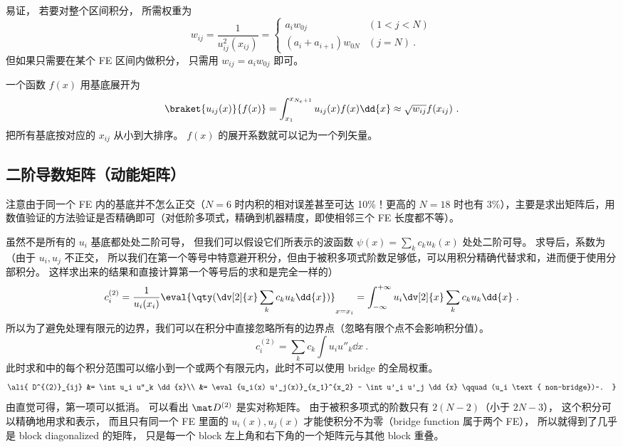 易证， 若要对整个区间积分， 所需权重为
\begin{equation}
w_{ij} = \frac{1}{u_{ij}^2(x_{ij})} =
\begin{cases}
a_i w_{0j} &(1 < j < N) \\
(a_i + a_{i+1}) w_{0N} &(j = N)~.
\end{cases}
\end{equation}
但如果只需要在某个 FE 区间内做积分， 只需用 $w_{ij} = a_i w_{0j}$ 即可。

一个函数 $f(x)$ 用基底展开为
\begin{equation}
\braket{u_{ij}(x)}{f(x)} = \int_{x_1}^{x_{N_e+1}} u_{ij}(x) f(x) \dd{x} \approx \sqrt{w_{ij}} f(x_{ij})~.
\end{equation}
把所有基底按对应的 $x_{ij}$ 从小到大排序。 $f(x)$ 的展开系数就可以记为一个列矢量。

\subsection{二阶导数矩阵（动能矩阵）}
注意由于同一个 FE 内的基底并不怎么正交（$N=6$ 时内积的相对误差甚至可达 10\%！更高的 $N=18$ 时也有 3\%），主要是求出矩阵后，用数值验证的方法验证是否精确即可（对低阶多项式，精确到机器精度，即使相邻三个 FE 长度都不等）。

虽然不是所有的 $u_i$ 基底都处处二阶可导， 但我们可以假设它们所表示的波函数 $\psi(x) = \sum_k c_k u_k(x)$ 处处二阶可导。 求导后，系数为（由于 $u_i, u_j$ 不正交， 所以我们在第一个等号中特意避开积分，但由于被积多项式阶数足够低，可以用积分精确代替求和，进而便于使用分部积分。 这样求出来的结果和直接计算第一个等号后的求和是完全一样的）
\begin{equation}
c_i^{(2)} = \frac{1}{u_i(x_i)}\eval{\qty(\dv[2]{x}\sum_k c_k u_k \dd{x})}_{x=x_i} = \int_{-\infty}^{+\infty} {u_i}\dv[2]{x}\sum_k c_k u_k \dd{x}~.
\end{equation}
所以为了避免处理有限元的边界，我们可以在积分中直接忽略所有的边界点（忽略有限个点不会影响积分值）。
\begin{equation}
c_i^{(2)} = \sum_k c_k \int u_i u''_k \dd{x}~.
\end{equation}
此时求和中的每个积分范围可以缩小到一个或两个有限元内，此时不可以使用 bridge 的全局权重。
\begin{equation}\ali{
D^{(2)}_{ij} &= \int u_i u''_k \dd{x}\\
&= \eval{u_i(x) u'_j(x)}_{x_1}^{x_2} - \int u'_i u'_j \dd{x} \qquad (u_i \text{ non-bridge})~.
}\end{equation}
由直觉可得，第一项可以抵消。 可以看出 $\mat D^{(2)}$ 是实对称矩阵。 由于被积多项式的阶数只有 $2(N-2)$（小于 $2N-3$）， 这个积分可以精确地用求和表示， 而且只有同一个 FE 里面的 $u_i(x), u_j(x)$ 才能使积分不为零（bridge function 属于两个 FE）， 所以就得到了几乎是 block diagonalized 的矩阵， 只是每一个 block 左上角和右下角的一个矩阵元与其他 block 重叠。

